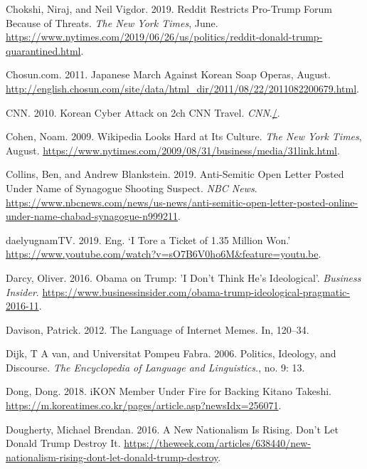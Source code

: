 \documentclass[10pt,british,A4paper,,openany]{memoir}
\begin{document}
\hypertarget{ref-chokshi_reddit_2019}{}
Chokshi, Niraj, and Neil Vigdor. 2019. Reddit Restricts Pro-Trump Forum
Because of Threats. \emph{The New York Times}, June.
\url{https://www.nytimes.com/2019/06/26/us/politics/reddit-donald-trump-quarantined.html}.

\hypertarget{ref-chosun.com_japanese_2011}{}
Chosun.com. 2011. Japanese March Against Korean Soap Operas, August.
\url{http://english.chosun.com/site/data/html_dir/2011/08/22/2011082200679.html}.

\hypertarget{ref-cnn_korean_2010}{}
CNN. 2010. Korean Cyber Attack on 2ch CNN Travel.
\emph{CNN}.\href{./}{/}.

\hypertarget{ref-cohen_wikipedia_2009}{}
Cohen, Noam. 2009. Wikipedia Looks Hard at Its Culture. \emph{The New
York Times}, August.
\url{https://www.nytimes.com/2009/08/31/business/media/31link.html}.

\hypertarget{ref-collins_anti-semitic_2019}{}
Collins, Ben, and Andrew Blankstein. 2019. Anti-Semitic Open Letter
Posted Under Name of Synagogue Shooting Suspect. \emph{NBC News}.
\url{https://www.nbcnews.com/news/us-news/anti-semitic-open-letter-posted-online-under-name-chabad-synagogue-n999211}.

\hypertarget{ref-daelyugnamtv_eng._2019}{}
daelyugnamTV. 2019. Eng. `I Tore a Ticket of 1.35 Million Won.'
\url{https://www.youtube.com/watch?v=sO7B6V0ho6M\&feature=youtu.be}.

\hypertarget{ref-darcy_obama_2016}{}
Darcy, Oliver. 2016. Obama on Trump: 'I Don't Think He's Ideological'.
\emph{Business Insider}.
\url{https://www.businessinsider.com/obama-trump-ideological-pragmatic-2016-11}.

\hypertarget{ref-davison_language_2012}{}
Davison, Patrick. 2012. The Language of Internet Memes. In, 120--34.

\hypertarget{ref-van_dijk_politics_2006}{}
Dijk, T A van, and Universitat Pompeu Fabra. 2006. Politics, Ideology,
and Discourse. \emph{The Encyclopedia of Language and Linguistics.}, no.
9: 13.

\hypertarget{ref-dong_ikon_2018}{}
Dong, Dong. 2018. iKON Member Under Fire for Backing Kitano Takeshi.
\url{https://m.koreatimes.co.kr/pages/article.asp?newsIdx=256071}.

\hypertarget{ref-dougherty_new_2016}{}
Dougherty, Michael Brendan. 2016. A New Nationalism Is Rising. Don't Let
Donald Trump Destroy It.
\url{https://theweek.com/articles/638440/new-nationalism-rising-dont-let-donald-trump-destroy}.
\end{document}
